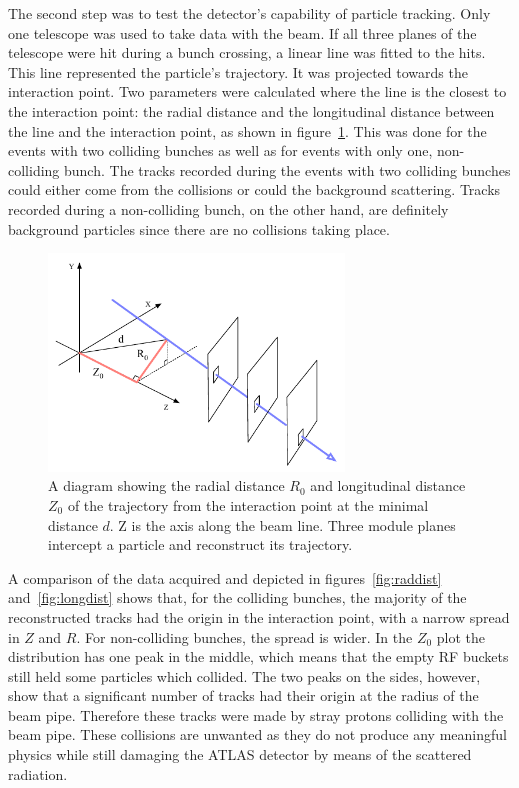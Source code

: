 The second step was to test the detector's capability of particle tracking. Only one telescope was used to take data with the beam. If all three planes of the telescope were hit during a bunch crossing, a linear line was fitted to the hits. This line represented the particle's trajectory. It was projected towards the interaction point. Two parameters were calculated where the line is the closest to the interaction point: the radial distance and the longitudinal distance between the line and the interaction point, as shown in figure~\ref{fig:z-r-distance}. This was done for the events with two colliding bunches as well as for events with only one, non-colliding bunch. The tracks recorded during the events with two colliding bunches could either come from the collisions or could the background scattering. Tracks recorded during a non-colliding bunch, on the other hand, are definitely background particles since there are no collisions taking place. 
\begin{figure}[!t]
\centering
\includegraphics[width=0.7\textwidth]{../scripts/04_charge_monitoring/plots/z-r-distance}
\caption{A diagram showing the radial distance $R_\mathrm{0}$ and longitudinal distance $Z_\mathrm{0}$ of the trajectory from the interaction point at the minimal distance $d$. Z is the axis along the beam line. Three module planes intercept a particle and reconstruct its trajectory.}
\label{fig:z-r-distance}
\end{figure}

A comparison of the data acquired and depicted in figures~\ref{fig:raddist} and~\ref{fig:longdist} shows that, for the colliding bunches, the majority of the reconstructed tracks had the origin in the interaction point, with a narrow spread in $Z$ and $R$. For non-colliding bunches, the spread is wider. In the $Z_\mathrm{0}$ plot the distribution has one peak in the middle, which means that the empty RF buckets still held some particles which collided. The two peaks on the sides, however, show that a significant number of tracks had their origin at the radius of the beam pipe. Therefore these tracks were made by stray protons colliding with the beam pipe. These collisions are unwanted as they do not produce any meaningful physics while still damaging the ATLAS detector by means of the scattered radiation.

